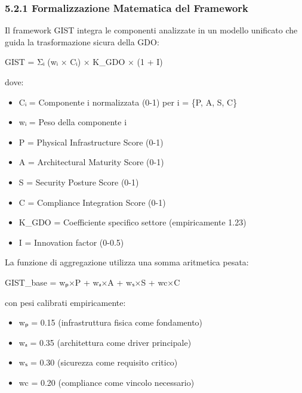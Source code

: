 \documentclass{report}
\begin{document}
\subsubsection{5.2.1 Formalizzazione Matematica del
Framework}\label{formalizzazione-matematica-del-framework}

Il framework GIST integra le componenti analizzate in un modello
unificato che guida la trasformazione sicura della GDO:

GIST = Σᵢ (wᵢ × Cᵢ) × K\_GDO × (1 + I)

dove:

\begin{itemize}
\tightlist
\item
  Cᵢ = Componente i normalizzata (0-1) per i = \{P, A, S, C\}\\
\item
  wᵢ = Peso della componente i\\
\item
  P = Physical Infrastructure Score (0-1)\\
\item
  A = Architectural Maturity Score (0-1)\\
\item
  S = Security Posture Score (0-1)\\
\item
  C = Compliance Integration Score (0-1)\\
\item
  K\_GDO = Coefficiente specifico settore (empiricamente 1.23)\\
\item
  I = Innovation factor (0-0.5)
\end{itemize}

La funzione di aggregazione utilizza una somma aritmetica pesata:

GIST\_base = wₚ×P + wₐ×A + wₛ×S + wc×C

con pesi calibrati empiricamente:

\begin{itemize}
\tightlist
\item
  wₚ = 0.15 (infrastruttura fisica come fondamento)\\
\item
  wₐ = 0.35 (architettura come driver principale)\\
\item
  wₛ = 0.30 (sicurezza come requisito critico)\\
\item
  wc = 0.20 (compliance come vincolo necessario)
\end{itemize}
\end{document}
